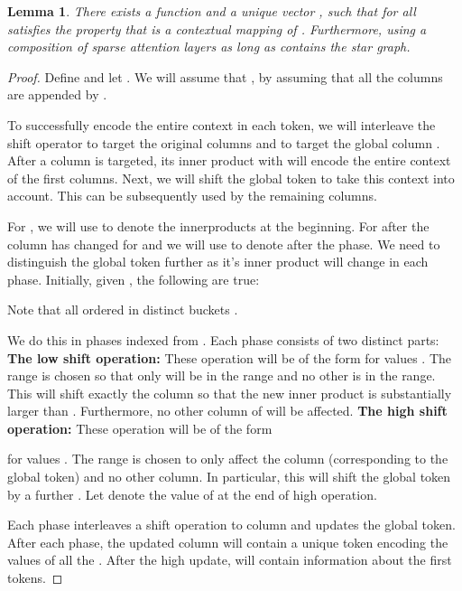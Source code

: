 \documentclass{article}
\newtheorem{lemma}{Lemma}
\begin{document}
\begin{lemma}
    \label{lem:contextual}
    There  exists  a function  and 
    a unique vector , such that for all   
    satisfies the property that  is a  contextual mapping of . 
    Furthermore,  using a composition of sparse attention layers
    as long as  contains the star graph. 
\end{lemma}
\begin{proof}
    Define  and let 
    .  We will assume that , by assuming that all the 
    columns  are appended by . 
    
    To successfully encode the entire context in each token, we will interleave the shift operator
    to target the original columns  and to target the global column . After a column  is targeted, its inner product with  will encode the entire context of the first  columns. 
    Next, we will shift the global token to take this context into account. This can be subsequently used by the  remaining columns.    
    
    For , we will use   to denote the innerproducts  at the beginning. For 
     after the  column has changed for  and we will use
     to denote  after the  phase. We need to distinguish the global token  
    further as it's inner product will change in each phase. 
    Initially, given  , the following are true:
    
   Note that all  ordered in distinct buckets . 
    
We do this in phases indexed from .  Each phase consists of two distinct parts:
    \newline
    \textbf{ The low shift operation:} These operation will be  of the form
          for values
        . 
        The range is chosen so that only  will be in the range and no other  
        is in the range. 
        This will shift exactly the  column  so that the new inner product
          is substantially larger than . Furthermore, no
        other column of  will be affected. 
    \newline
    \textbf{ The high shift operation: }
    These operation will be  of the form
         
        for values . The range  is chosen to 
        only affect the column  (corresponding to the global token) and no other column. In particular, this 
        will shift the global token by a further . Let  denote the value of 
         at the end of  high operation. 
    
    Each phase interleaves a shift operation to column  and updates the global token. 
    After each phase, the updated  column  will contain a unique token
    encoding the values of all the . After the high update, 
    will contain information about the first  tokens. 
    

\end{proof}
\end{document}
